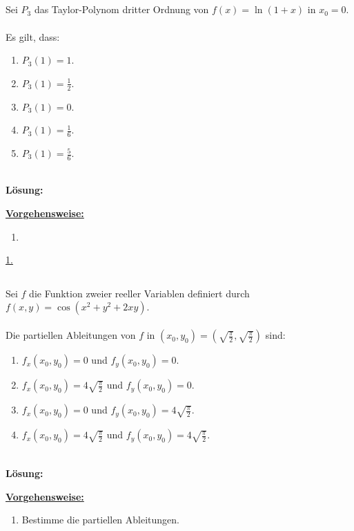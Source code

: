 \subsection*{}
Sei $P_3$ das Taylor-Polynom dritter Ordnung von $f(x) = \ln(1+ x) $ in $x_0 = 0$.\\
\\
Es gilt, dass:
\renewcommand{\labelenumi}{(\alph{enumi})}
\begin{enumerate}
	\item 
	$P_3(1) = 1 $.
	\item 
	$P_3(1) = \frac{1 }{2}$.
	\item
	$P_3(1) =  0$.
	\item
	$P_3(1) = \frac{1 }{6}$.
	\item
	$P_3(1) = \frac{5 }{6}$.
\end{enumerate}
\ \\
\textbf{Lösung:}
\begin{mdframed}
\underline{\textbf{Vorgehensweise:}}
\renewcommand{\labelenumi}{\theenumi.}
\begin{enumerate}
\item 

\end{enumerate}
\end{mdframed}

\underline{1. }\\

\newpage

\subsection*{}
Sei $f$ die Funktion zweier reeller Variablen definiert durch $f(x,y) = \cos(x^2 +y^2 + 2xy).$\\
\\
Die partiellen Ableitungen von $f$ in $(x_0, y_0) = \left(\sqrt{\frac{\pi}{2}}, \sqrt{\frac{\pi}{2}}\right)$ sind:
\renewcommand{\labelenumi}{(\alph{enumi})}
\begin{enumerate}
	\item 
	$f_x(x_0,y_0) = 0$ und $f_y(x_0,y_0) = 0$.
	\item
	$f_x(x_0,y_0) = 4 \sqrt{\frac{\pi}{2}} $ und $f_y(x_0,y_0) = 0$.
	\item
	$f_x(x_0,y_0) = 0 $ und $f_y(x_0,y_0) = 4 \sqrt{\frac{\pi}{2}}$.
	\item
	$f_x(x_0,y_0) = 4 \sqrt{\frac{\pi}{2}} $ und $f_y(x_0,y_0) = 4 \sqrt{\frac{\pi}{2}}$.
\end{enumerate}
\ \\
\textbf{Lösung:}
\begin{mdframed}
\underline{\textbf{Vorgehensweise:}}
\renewcommand{\labelenumi}{\theenumi.}
\begin{enumerate}
\item Bestimme die partiellen Ableitungen.
\end{enumerate}
\end{mdframed}

